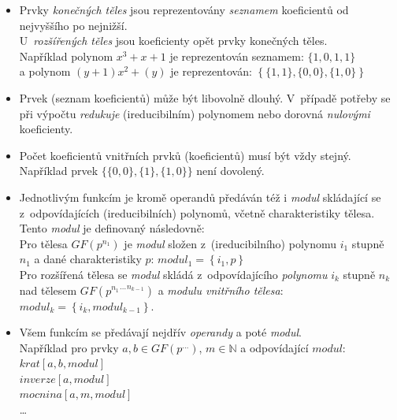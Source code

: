 \documentclass[thesis=M,czech,hidelinks]{FITthesis}[2012/06/26]
\newcommand{\0}{{\textcolor[gray]{0.80}{0}}}
\begin{document}
\begin{itemize}
    \item Prvky \emph{konečných těles} jsou reprezentovány \emph{seznamem}
        koeficientů od nejvyššího po nejnižší. \\ U~\emph{rozšířených těles}
        jsou koeficienty opět prvky konečných těles. \\
        Například polynom $x^3+x+1$ je reprezentován seznamem: $\{1,0,1,1\}$ \\
        a polynom $(y+1)x^2 + (y)$ je reprezentován:
        $\left\{\{1,1\},\{0,0\},\{1,0\}\right\}$

    \item Prvek (seznam koeficientů) může být libovolně dlouhý. V~případě
        potřeby se při výpočtu \emph{redukuje} (ireducibilním) polynomem nebo
        dorovná \emph{nulovými} koeficienty.

    \item Počet koeficientů vnitřních prvků (koeficientů) musí být vždy stejný. \\
        Například prvek $\{\{0,0\},\{1\},\{1,0\}\}$ není dovolený.

    \item Jednotlivým funkcím je kromě operandů předáván též i \emph{modul}
        skládající se z~odpovídajících (ireducibilních) polynomů, včetně
        charakteristiky tělesa. Tento \emph{modul} je definovaný následovně: \\
        Pro tělesa $GF(p^{n_1})$ je \emph{modul} složen z~(ireducibilního)
        polynomu $i_1$ stupně $n_1$ a dané charakteristiky $p$:
        $modul_1 = \left\{i_1,p\right\}$ \\
        Pro rozšířená tělesa se \emph{modul} skládá z~odpovídajícího
        \emph{polynomu} $i_k$ stupně $n_k$ nad tělesem
        $GF( {{p^{n_1}}^{\dots}}^{n_{k-1}} )$ a \emph{modulu vnitřního tělesa}: \\
        $modul_k = \left\{i_k,modul_{k-1}\right\}$.

    \item Všem funkcím se předávají nejdřív \emph{operandy} a poté
        \emph{modul}.\\ Například pro prvky $a,b\in GF(p^{\ldots})$,
        $m\in\mathbb{N}$ a odpovídající $modul$: \\
        \hspace*{0.6cm}$krat[a,b,modul]$ \\
        \hspace*{0.6cm}$inverze[a,modul]$ \\
        \hspace*{0.6cm}$mocnina[a,m,modul]$ \\
        \hspace*{0.6cm}\ldots


\end{itemize}
\end{document}
